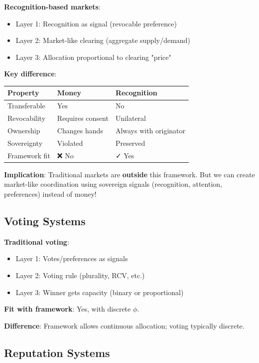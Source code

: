 \documentclass[11pt,a4paper]{article}
\theoremstyle{definition}
\theoremstyle{remark}
\begin{document}
\textbf{Recognition-based markets}:
\begin{itemize}
\item Layer 1: Recognition as signal (revocable preference)
\item Layer 2: Market-like clearing (aggregate supply/demand)
\item Layer 3: Allocation proportional to clearing "price"
\end{itemize}

\textbf{Key difference}:
\begin{center}
\begin{tabular}{lll}
\toprule
\textbf{Property} & \textbf{Money} & \textbf{Recognition} \\
\midrule
Transferable & Yes & No \\
Revocability & Requires consent & Unilateral \\
Ownership & Changes hands & Always with originator \\
Sovereignty & Violated & Preserved \\
\midrule
Framework fit & ❌ No & ✓ Yes \\
\bottomrule
\end{tabular}
\end{center}

\textbf{Implication}: Traditional markets are \textbf{outside} this framework. But we can create market-like coordination using sovereign signals (recognition, attention, preferences) instead of money!

\subsection{Voting Systems}

\textbf{Traditional voting}:
\begin{itemize}
\item Layer 1: Votes/preferences as signals
\item Layer 2: Voting rule (plurality, RCV, etc.)
\item Layer 3: Winner gets capacity (binary or proportional)
\end{itemize}

\textbf{Fit with framework}: Yes, with discrete $\phi$.

\textbf{Difference}: Framework allows continuous allocation; voting typically discrete.

\subsection{Reputation Systems}
\end{document}
